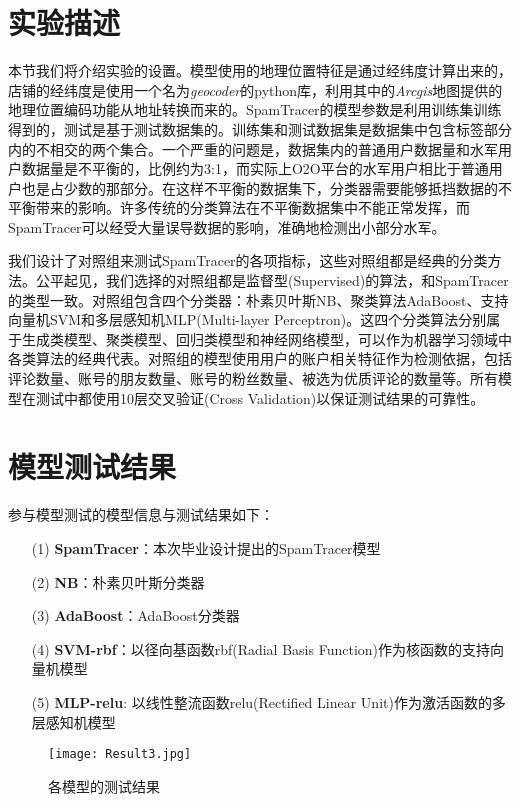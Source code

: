 \section{实验描述}

本节我们将介绍实验的设置。模型使用的地理位置特征是通过经纬度计算出来的，店铺的经纬度是使用一个名为\emph{geocoder}的python库，利用其中的\emph{Arcgis}地图提供的地理位置编码功能从地址转换而来的。SpamTracer的模型参数是利用训练集训练得到的，测试是基于测试数据集的。训练集和测试数据集是数据集中包含标签部分内的不相交的两个集合。一个严重的问题是，数据集内的普通用户数据量和水军用户数据量是不平衡的，比例约为3:1，而实际上O2O平台的水军用户相比于普通用户也是占少数的那部分。在这样不平衡的数据集下，分类器需要能够抵挡数据的不平衡带来的影响。许多传统的分类算法在不平衡数据集中不能正常发挥，而SpamTracer可以经受大量误导数据的影响，准确地检测出小部分水军。

我们设计了对照组来测试SpamTracer的各项指标，这些对照组都是经典的分类方法。公平起见，我们选择的对照组都是监督型(Supervised)的算法，和SpamTracer的类型一致。对照组包含四个分类器：朴素贝叶斯NB、聚类算法AdaBoost、支持向量机SVM和多层感知机MLP(Multi-layer Perceptron)。这四个分类算法分别属于生成类模型、聚类模型、回归类模型和神经网络模型，可以作为机器学习领域中各类算法的经典代表。对照组的模型使用用户的账户相关特征作为检测依据，包括评论数量、账号的朋友数量、账号的粉丝数量、被选为优质评论的数量等。所有模型在测试中都使用10层交叉验证(Cross Validation)以保证测试结果的可靠性。


\section{模型测试结果}

参与模型测试的模型信息与测试结果如下：

\begin{enumerate}	
	\item[(1)] \textbf{SpamTracer}：本次毕业设计提出的SpamTracer模型
	\item[(2)] \textbf{NB}：朴素贝叶斯分类器
	\item[(3)] \textbf{AdaBoost}：AdaBoost分类器
	\item[(4)] \textbf{SVM-rbf}：以径向基函数rbf(Radial Basis Function)作为核函数的支持向量机模型
	\item[(5)] \textbf{MLP-relu}: 以线性整流函数relu(Rectified Linear Unit)作为激活函数的多层感知机模型
\end{enumerate}


\begin{figure}[htbp]
	\centering
	\begin{minipage}[htbp]{0.6\textwidth}
		\centering
		\texttt{[image: Result3.jpg]}
		\caption[各模型的测试结果]
		{各模型的测试结果\label{fig:result}}		
	\end{minipage}     
\end{figure}


